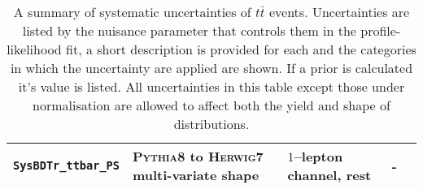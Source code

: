 \begin{table}[hbpt!]
{\begin{tabular}{lllll}
      \texttt{SysBDTr\_ttbar\_PS} & \textsc{Pythia8} to \textsc{Herwig7} multi-variate shape  & $1$--lepton channel, rest & - \\
      \bottomrule
    \end{tabular}
  }
  \caption[A summary of systematic uncertainties on $t\bar{t}$ events.]{A
    summary of systematic uncertainties of $t\bar{t}$ events. Uncertainties are
    listed by the nuisance parameter that controls them in the profile-likelihood
    fit, a short description is provided for each and the categories in which the
    uncertainty are applied are shown. If a prior is calculated it's value is
    listed. All uncertainties in this table except those under normalisation are
    allowed to affect both the yield and shape of distributions.}
  \label{tab:ttbar-systs}
\end{table}